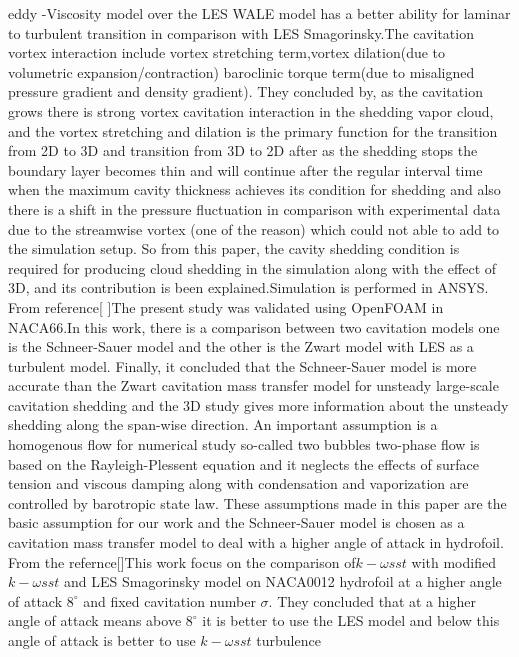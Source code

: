 eddy -Viscosity model over the LES WALE model has a better ability for laminar to turbulent transition in comparison with LES Smagorinsky.The cavitation vortex interaction include vortex stretching term,vortex dilation(due to volumetric expansion/contraction)
baroclinic torque term(due to misaligned pressure gradient and density gradient). They concluded by, as the cavitation grows there is strong vortex cavitation interaction in the shedding vapor cloud, and the vortex
stretching and dilation is the primary function for the transition from 2D to 3D and transition from 3D to 2D after as the shedding stops the boundary layer becomes thin and will continue after 
the regular interval time when the maximum cavity thickness achieves its condition for shedding  and also there is a  shift in the pressure fluctuation in comparison with experimental data due to the streamwise vortex (one of the reason)
which could not able to add to the simulation setup. So from this paper, the cavity shedding condition is required for producing cloud shedding in the simulation along with the effect of 3D, and its contribution is been explained.Simulation is performed in ANSYS.
From reference[\cite{Hidalgo2014} \cite {Hai2020}]The present study was validated using OpenFOAM in NACA66.In this work, there is a comparison between two cavitation models one is the Schneer-Sauer model and the other is the Zwart model with LES 
as a turbulent model. Finally, it concluded that the Schneer-Sauer model is more accurate than the Zwart cavitation mass transfer model for unsteady large-scale cavitation shedding and the 3D study gives more information 
about the unsteady shedding along the span-wise direction. An important assumption is a homogenous flow for numerical study so-called two bubbles two-phase flow is based on the Rayleigh-Plessent equation and it 
neglects the effects of surface tension and viscous damping along with condensation and vaporization are controlled by barotropic state law. These assumptions made in this paper are the basic assumption 
for our work and the Schneer-Sauer model is chosen as a cavitation mass transfer model  to deal with a higher angle of attack in hydrofoil.
From the refernce[\cite{Zhao2021}]This work focus on the comparison of$k-\omega sst$ with modified $k-\omega sst$ and LES Smagorinsky model on NACA0012 hydrofoil at a higher angle of attack $8^{\circ}$ 
and fixed cavitation number $\sigma$. They concluded that at a higher angle of attack means above $8^\circ$ it is better to use the LES model and below this angle of attack is better to use $k-\omega sst$ turbulence 
